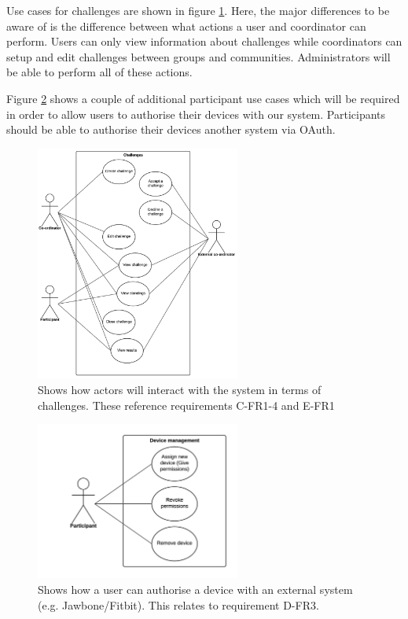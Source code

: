 Use cases for challenges are shown in figure \ref{fig:use-case-challenges}. Here, the major differences to be aware of is the difference between what actions a user and coordinator can perform. Users can only view information about challenges while coordinators can setup and edit challenges between groups and communities. Administrators will be able to perform all of these actions.

Figure \ref{fig:use-case-assigning-devices} shows a couple of additional participant use cases which will be required in order to allow users to authorise their devices with our system. Participants should be able to authorise their devices another system via OAuth.


\begin{figure}[H]
\centering
\includegraphics[width=0.6\textwidth]{../design/UML/UseCase/Challenges.png}
\caption{Shows how actors will interact with the system in terms of challenges. These reference requirements C-FR1-4 and E-FR1}
\label{fig:use-case-challenges}
\end{figure}

\begin{figure}[H]
\centering
\includegraphics[width=0.6\textwidth]{../design/UML/UseCase/Assigning-Devices.png}
\caption{Shows how a user can authorise a device with an external system (e.g. Jawbone/Fitbit). This relates to requirement D-FR3.}
\label{fig:use-case-assigning-devices}
\end{figure}

